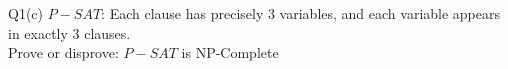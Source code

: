 \begin{problem}
    {Q1(c)}
    $P-SAT$: Each clause has precisely 3 variables, and each variable appears in exactly 3 clauses. \\
    Prove or disprove: $P-SAT$ is NP-Complete
\end{problem}
